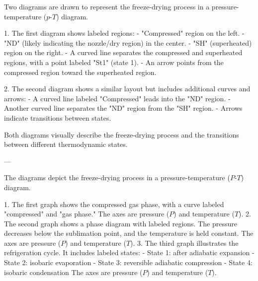 Two diagrams are drawn to represent the freeze-drying process in a pressure-temperature (\(p\)-\(T\)) diagram.  

1. The first diagram shows labeled regions:  
   - "Compressed" region on the left.  
   - "ND" (likely indicating the nozzle/dry region) in the center.  
   - "SH" (superheated) region on the right.  
   - A curved line separates the compressed and superheated regions, with a point labeled "St1" (state 1).  
   - An arrow points from the compressed region toward the superheated region.  

2. The second diagram shows a similar layout but includes additional curves and arrows:  
   - A curved line labeled "Compressed" leads into the "ND" region.  
   - Another curved line separates the "ND" region from the "SH" region.  
   - Arrows indicate transitions between states.  

Both diagrams visually describe the freeze-drying process and the transitions between different thermodynamic states.  

---

The diagrams depict the freeze-drying process in a pressure-temperature (\(P\)-\(T\)) diagram.  

1. The first graph shows the compressed gas phase, with a curve labeled "compressed" and "gas phase." The axes are pressure (\(P\)) and temperature (\(T\)).  
2. The second graph shows a phase diagram with labeled regions. The pressure decreases below the sublimation point, and the temperature is held constant. The axes are pressure (\(P\)) and temperature (\(T\)).  
3. The third graph illustrates the refrigeration cycle. It includes labeled states:  
   - State 1: after adiabatic expansion  
   - State 2: isobaric evaporation  
   - State 3: reversible adiabatic compression  
   - State 4: isobaric condensation  
   The axes are pressure (\(P\)) and temperature (\(T\)).